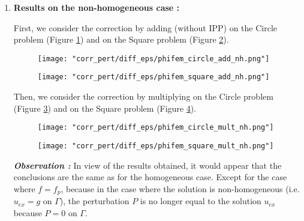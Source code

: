\begin{enumerate}[label=\textbullet]
	\item \textbf{Results on the non-homogeneous case :}
	
	First, we consider the correction by adding (without IPP) on the Circle problem (Figure \ref{corr_pert_phifem_circle_add_nh}) and on the Square problem (Figure \ref{corr_pert_phifem_square_add_nh}).
	
	\begin{minipage}{0.48\linewidth}
		\begin{figure}[H]
			\centering
			\texttt{[image: "corr\_pert/diff\_eps/phifem\_circle\_add\_nh.png"]}
			\label{corr_pert_phifem_circle_add_nh}
		\end{figure} 
	\end{minipage}
	\begin{minipage}{0.48\linewidth}
		\begin{figure}[H]
			\centering
			\texttt{[image: "corr\_pert/diff\_eps/phifem\_square\_add\_nh.png"]}
			\label{corr_pert_phifem_square_add_nh}
		\end{figure} 
	\end{minipage}
	
	Then, we consider the correction by multiplying on the Circle problem (Figure \ref{corr_pert_phifem_circle_mult_nh}) and on the Square problem (Figure \ref{corr_pert_phifem_square_mult_nh}).
	
	\begin{minipage}{0.48\linewidth}
		\begin{figure}[H]
			\centering
			\texttt{[image: "corr\_pert/diff\_eps/phifem\_circle\_mult\_nh.png"]}
			\label{corr_pert_phifem_circle_mult_nh}
		\end{figure} 
	\end{minipage}
	\begin{minipage}{0.48\linewidth}
		\begin{figure}[H]
			\centering
			\texttt{[image: "corr\_pert/diff\_eps/phifem\_square\_mult\_nh.png"]}
			\label{corr_pert_phifem_square_mult_nh}
		\end{figure} 
	\end{minipage}
	
	\textbf{\textit{Observation :}} In view of the results obtained, it would appear that the conclusions are the same as for the homogeneous case. Except for the case where $f=f_p$, because in the case where the solution is non-homogeneous (i.e. $u_{ex}=g$ on $\Gamma$), the perturbation $P$ is no longer equal to the solution $u_{ex}$ because $P=0$ on $\Gamma$.
\end{enumerate}


